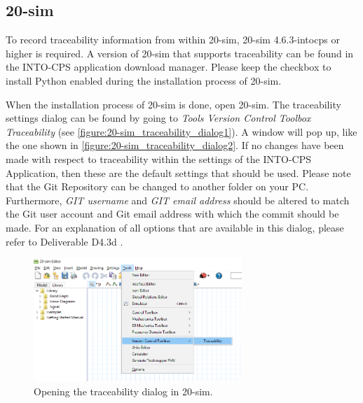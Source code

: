 \subsection{20-sim}
To record traceability information from within 20-sim, 20-sim 4.6.3-intocps or higher is required. A version of 20-sim that supports traceability can be found in the INTO-CPS application download manager. Please keep the checkbox to install Python enabled during the installation process of 20-sim.

When the installation process of 20-sim is done, open 20-sim. The traceability settings dialog can be found by going to \emph{Tools \textrightarrow Version Control Toolbox \textrightarrow Traceability} (see \autoref{figure:20-sim_traceability_dialog1}). A window will pop up, like the one shown in \autoref{figure:20-sim_traceability_dialog2}. If no changes have been made with respect to traceability within the settings of the INTO-CPS Application, then these are the default settings that should be used. Please note that the Git Repository can be changed to another folder on your PC. Furthermore, \emph{GIT username} and \emph{GIT email address} should be altered to match the Git user account and Git email address with which the commit should be made. For an explanation of all options that are available in this dialog, please refer to Deliverable D4.3d \cite{INTOCPSD4.3d}.
%
\begin{figure}[ht]
	\centerline{\includegraphics[width=0.7\textwidth]{figures/20sim_TraceabilityDialog1.png}}
	\caption{Opening the traceability dialog in 20-sim.}
	\label{figure:20-sim_traceability_dialog1}
\end{figure}
%

